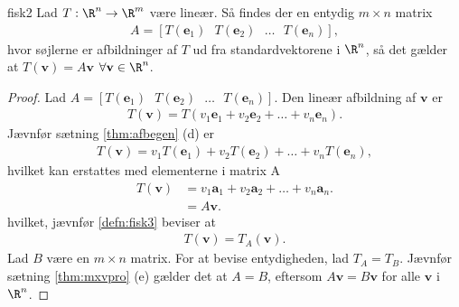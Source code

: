 %
% 
\begin{thm}{}{fisk2}
Lad $T: \R^n \rightarrow \R^m$ være lineær. 
Så findes der en entydig $m \times n$ matrix
\begin{align*}
A= [T(\mathbf{e}_1)\text{    } T(\mathbf{e}_2) \text{    } \ldots \text{    } T(\mathbf{e}_n)],
\end{align*}
hvor søjlerne er afbildninger af $T$ ud fra standardvektorene i $\R^n$, så det gælder at $T(\mathbf{v})=A \mathbf{v}$  $\forall \mathbf{v} \in \R^n$.
\end{thm}
%
%
\begin{proof}
Lad $A= [T(\mathbf{e}_1)\text{    } T(\mathbf{e}_2) \text{    } \ldots \text{    } T(\mathbf{e}_n)]$. 
Den lineær afbildning af $\mathbf{v}$ er
%
\begin{align*}
T(\mathbf{v})= T(v_1 \mathbf{e}_1+v_2 \mathbf{e}_2+ \ldots + v_n \mathbf{e}_n).
\end{align*}
%
Jævnfør sætning \ref{thm:afbegen} (d) er
%
\begin{align*}
T(\mathbf{v})= v_1 T( \mathbf{e}_1)+ v_2 T( \mathbf{e}_2) + \ldots + v_n T( \mathbf{e}_n),
\end{align*}
%
hvilket kan erstattes med elementerne i matrix A
%
\begin{align*}
T(\mathbf{v})&= v_1 \mathbf{a}_1+ v_2 \mathbf{a}_2 + \ldots + v_n \mathbf{a}_n. \\
&= A \mathbf{v}.
\end{align*}
%
hvilket, jævnfør \ref{defn:fisk3} beviser at
%
\begin{align*}
T(\mathbf{v})= T_A (\mathbf{v}).
\end{align*}
%
Lad $B$ være en $m \times n$ matrix. 
For at bevise entydigheden, lad $T_A=T_B$. 
Jævnfør sætning \ref{thm:mxvpro} (e) gælder det at $A=B$, eftersom $A \mathbf{v}=B \mathbf{v}$ for alle $\mathbf{v}$ i $\R^n$.
\end{proof}
%
